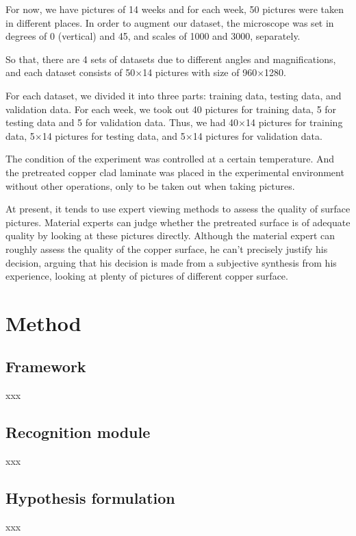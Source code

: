 \documentclass[10pt,twocolumn,letterpaper]{article}
\begin{document}
For now, we have pictures of 14 weeks and for each week, 50 pictures were taken in different places.
In order to augment our dataset, the microscope was set in degrees of 0 (vertical) and 45, and scales of 1000 and 3000, separately.

So that, there are 4 sets of datasets due to different angles and magnifications, and each dataset consists of 50$\times$14 pictures with size of 960$\times$1280.

For each dataset, we divided it into three parts: training data, testing data, and validation data.
For each week, we took out 40 pictures for training data, 5 for testing data and 5 for validation data.
Thus, we had 40$\times$14 pictures for training data, 5$\times$14 pictures for testing data, and 5$\times$14 pictures for validation data.

The condition of the experiment was controlled at a certain temperature. And the pretreated copper clad laminate was placed in the experimental environment without other operations, only to be taken out when taking pictures. 

At present, it tends to use expert viewing methods to assess the quality of surface pictures.
Material experts can judge whether the pretreated surface is of adequate quality by looking at these pictures directly.
Although the material expert can roughly assess the quality of the copper surface, he can't precisely justify his decision, arguing that his decision is made from a subjective synthesis from his experience, looking at plenty of pictures of different copper surface.

\section{Method}

\subsection{Framework}
xxx

\subsection{Recognition module}
xxx

\subsection{Hypothesis formulation}
xxx
\end{document}
